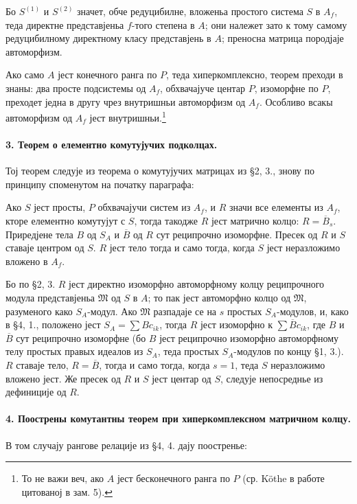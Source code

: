 ﻿\documentclass[11pt]{article}
\providecommand{\frM}{\mathfrak M}
\begin{document}
Бо \(S^{(1)}\) и \(S^{(2)}\) значет, обче редуцибилне, вложеньа простого система \(S\) в \(A_f\), теда директне представјеньа \(f\)-того степена в \(A\); они належет зато к тому самому редуцибилному директному класу представјень в \(A\); преносна матрица породјаје автоморфизм.

Ако само \(A\) јест конечного ранга по \(P\), теда хиперкомплексно, теорем преходи в знаны: два просте подсистемы од \(A_f\), обхвачајуче центар \(P\), изоморфне по \(P\), преходет једна в другу чрез внутришньи автоморфизм од \(A_f\). Особливо всакы автоморфизм од \(A_f\) јест внутришньи.\footnote{То не важи веч, ако \(A\) јест бесконечного ранга по \(P\) (ср. Köthe в работе цитованој в зам. 5).}

\paragraph{3. Теорем о елементно комутујучих подколцах.}
Тој теорем следује из теорема о комутујучих матрицах из §2, 3., знову по принципу споменутом на початку параграфа:

Ако \(S\) јест просты, \(P\) обхвачајучи систем из \(A_f\), и \(R\) значи все елементы из \(A_f\), кторе елементно комутујут с \(S\), тогда такодже \(R\) јест матрично колцо: \(R=\overline B_s\). Приредјене тела \(B\) од \(S_A\) и \(\overline B\) од \(R\) сут реципрочно изоморфне. Пресек од \(R\) и \(S\) ставаје центром од \(S\). \(R\) јест тело тогда и само тогда, когда \(S\) јест неразложимо вложено в \(A_f\).

Бо по §2, 3. \(R\) јест директно изоморфно автоморфному колцу реципрочного модула представјеньа \(\frM\) од \(S\) в \(A\); то пак јест автоморфно колцо од \(\frM\), разуменого како \(S_A\)-модул. Ако \(\frM\) разпадаје се на \(s\) простых \(S_A\)-модулов, и, како в §4, 1., положено јест \(S_A=\sum Bc_{ik}\), тогда \(R\) јест изоморфно к \(\sum \overline Bc_{ik}\), где \(B\) и \(\overline B\) сут реципрочно изоморфне (бо \(B\) јест реципрочно изоморфно автоморфному телу простых правых идеалов из \(S_A\), теда простых \(S_A\)-модулов по концу §1, 3.). \(R\) ставаје тело, \(R=\overline B\), тогда и само тогда, когда \(s=1\), теда \(S\) неразложимо вложено јест. Же пресек од \(R\) и \(S\) јест центар од \(S\), следује непосреднье из дефиниције од \(R\).

\paragraph{4. Поострены комутантны теорем при хиперкомплексном матричном колцу.}
В том случају рангове релације из §4, 4. дају поостренье:
\end{document}
